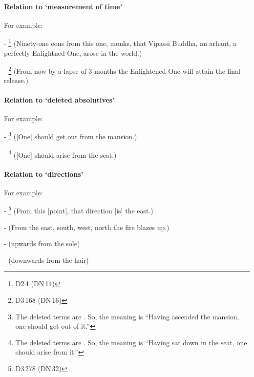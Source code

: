 \paragraph*{Relation to `measurement of time'} For example:\par
- \footnote{D2\,4 (DN\,14)} (Ninety-one eons from this one, monks, that Vipass\=i Buddha, an arhant, a perfectly Enlightned One, arose in the world.)\par
- \footnote{D3\,168 (DN\,16)} (From now by a lapse of 3 months the Enlightened One will attain the final release.)\par

\paragraph*{Relation to `deleted absolutives'} For example:\par
- \footnote{The deleted terms are . So, the meaning is ``Having ascended the mansion, one should get out of it.''} ([One] should get out from the mansion.)\par
- \footnote{The deleted terms are . So, the meaning is ``Having sat down in the seat, one should arise from it.''} ([One] should arise from the seat.)\par

\paragraph*{Relation to `directions'} For example:\par
- \footnote{D3\,278 (DN\,32)} (From this [point], that direction [is] the east.)\par
-  (From the east, south, west, north the fire blazes up.)\par
-  (upwards from the sole)\par
-  (downwards from the hair)\par

